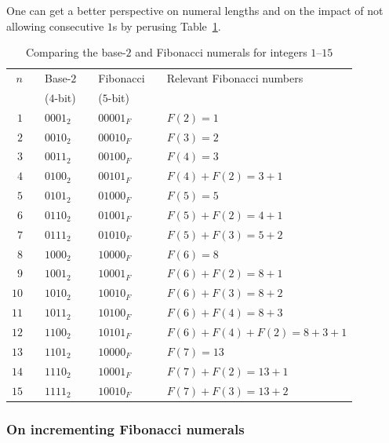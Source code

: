 One can get a better perspective on numeral lengths and on the impact of not allowing consecutive $1$s by perusing Table~\ref{tab:FIBO1-15}.

\begin{table}[htb]
\caption{Comparing the base-$2$ and Fibonacci numerals for integers $1$--$15$}
\label{tab:FIBO1-15}
\begin{tabular}{|rclclcl|}
\hline
$n$ & & Base-$2$  & & Fibonacci  & & Relevant Fibonacci numbers \\
       & & ($4$-bit)    & & ($5$-bit)   & & \\
\hline
\hline
$1$ & & $0001_2$ & & $00001_F$ & & $F(2) =1$ \\
\hline
$2$ & & $0010_2$ & & $00010_F$ & & $F(3) = 2$ \\
\hline
$3$ & & $0011_2$ & &  $00100_F$ & & $F(4) = 3$ \\
\hline
$4$ & & $0100_2$ & &  $00101_F$ & & $F(4) + F(2) = 3+1$ \\ 
\hline
$5$ & & $0101_2$ & &  $01000_F$ & & $F(5) = 5$ \\
\hline
$6$ & & $0110_2$ & &  $01001_F$ & & $F(5) + F(2) = 4+1$ \\
\hline 
$7$ & & $0111_2$ & &  $01010_F$ & &  $F(5) + F(3) = 5+2$ \\
\hline 
$8$ & & $1000_2$ & & $10000_F$ & &  $F(6) = 8$ \\ 
\hline
$9$ & & $1001_2$ & & $10001_F$ & &  $F(6) + F(2) = 8 +1$ \\ 
\hline
$10$ & & $1010_2$ & & $10010_F$ & &  $F(6) + F(3) = 8 +2$ \\ 
\hline
$11$ & & $1011_2$ & & $10100_F$ & &  $F(6) + F(4) = 8 +3$ \\ 
\hline
$12$ & & $1100_2$ & & $10101_F$ & &  $F(6) + F(4) + F(2) = 8 +3 +1$ \\ 
\hline
$13$ & & $1101_2$ & & $10000_F$ & &  $F(7) = 13$ \\ 
\hline
$14$ & & $1110_2$ & & $10001_F$ & &  $F(7)  + F(2) = 13 +1$ \\ 
\hline
$15$ & & $1111_2$ & & $10010_F$ & &  $F(7) + F(3) = 13 +2$ \\ 
\hline
\end{tabular}
\end{table}
 
\subsubsection{On incrementing Fibonacci numerals}

